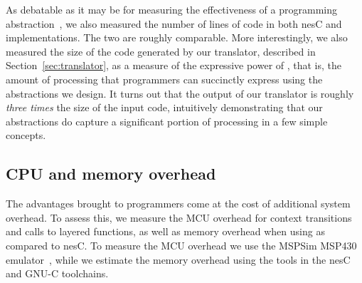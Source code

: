 

As debatable as it may be for measuring the effectiveness of a
programming abstraction~\cite{mottolasurvey}, we also measured the
number of lines of code in both nesC and \conesc implementations. The
two are roughly comparable. More interestingly, we also measured the
size of the code generated by our translator, described in
Section~\ref{sec:translator}, as a measure of the expressive power of
\conesc, that is, the amount of processing that \conesc programmers
can succinctly express using the abstractions we design. It turns out
that the output of our translator is roughly \emph{three times} the
size of the input code, intuitively demonstrating that our
abstractions do capture a significant portion of processing in a few
simple concepts.



\subsection{CPU and memory overhead}\label{sec:overhead}

The advantages brought to programmers come at the cost of additional
system overhead. To assess this, we measure the MCU overhead for
context transitions and calls to layered functions, as well as memory
overhead when using \conesc as compared to nesC. To measure the MCU
overhead we use the MSPSim MSP430 emulator~\cite{eriksson09}, while we
estimate the memory overhead using the tools in the nesC and GNU-C
toolchains.


